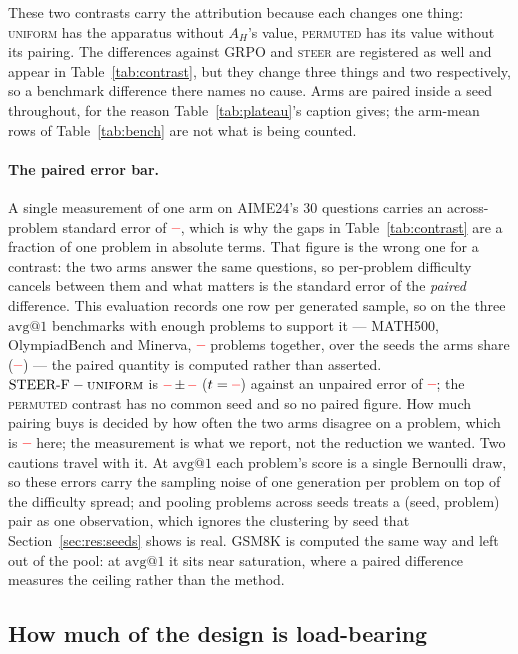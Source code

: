 \documentclass[11pt]{article}
\newcommand{\AH}{A_{H}}
\providecommand{\PENDING}{\textcolor{red}{\textbf{--}}}
\newcommand{\num}[1]{\ifcsname #1\endcsname\csname #1\endcsname\else\PENDING\fi}
\begin{document}
These two contrasts carry the attribution because each changes one thing:
\textsc{uniform} has the apparatus without $\AH$'s value, \textsc{permuted} has its
value without its pairing. The differences against GRPO and \textsc{steer} are
registered as well and appear in Table~\ref{tab:contrast}, but they change three
things and two respectively, so a benchmark difference there names no cause. Arms are
paired inside a seed throughout, for the reason Table~\ref{tab:plateau}'s caption
gives; the arm-mean rows of Table~\ref{tab:bench} are not what is being counted.

\paragraph{The paired error bar.} A single measurement of one arm on AIME24's $30$
questions carries an across-problem standard error of $\num{SEaime}$, which is why
the gaps in Table~\ref{tab:contrast} are a fraction of one problem in absolute terms.
That figure is the wrong one for a contrast: the two arms answer the same questions,
so per-problem difficulty cancels between them and what matters is the standard error
of the \emph{paired} difference. This evaluation records one row per generated
sample, so on the three $\mathrm{avg@}1$ benchmarks with enough problems to support
it --- MATH500, OlympiadBench and Minerva, $\num{Pairn}$ problems together, over the
seeds the arms share ($\num{Pairnseeds}$) --- the paired quantity is computed rather
than asserted. $\text{STEER-F} - \textsc{uniform}$ is $\num{Pairsigneduniform} \pm
\num{Pairsigneduniformse}$ ($t = \num{Pairsigneduniformt}$) against an unpaired error
of $\num{Pairsigneduniformunpse}$; the \textsc{permuted} contrast has no common
seed and so no paired figure. How much pairing buys is decided by how often the two
arms disagree on a problem, which is $\num{Pairsigneduniformdisc}$ here; the
measurement is what we report, not the reduction we wanted. Two cautions travel with
it. At $\mathrm{avg@}1$ each problem's score is a single Bernoulli draw, so these
errors carry the sampling noise of one generation per problem on top of the
difficulty spread; and pooling problems across seeds treats a (seed, problem) pair as
one observation, which ignores the clustering by seed that
Section~\ref{sec:res:seeds} shows is real. GSM8K is computed the same way and left
out of the pool: at $\mathrm{avg@}1$ it sits near saturation, where a paired
difference measures the ceiling rather than the method.

\subsection{How much of the design is load-bearing}
\label{sec:res:ablate}
\end{document}
